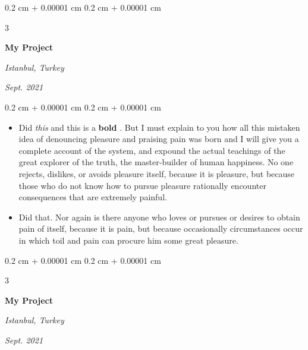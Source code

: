 \documentclass[10pt, letterpaper]{article}
\newenvironment{highlights}{
    \begin{itemize}[
        topsep=0.10 cm,
        parsep=0.10 cm,
        partopsep=0pt,
        itemsep=0pt,
        leftmargin=0.4 cm + 10pt + 0.6 cm
    ]
}{
    \end{itemize}
} %
\newenvironment{onecolentry}{
    \begin{adjustwidth}{
        0.2 cm + 0.00001 cm
    }{
        0.2 cm + 0.00001 cm
    }
}{
    \end{adjustwidth}
} %
\newenvironment{threecolentry}[3][]{
    \onecolentry
    \def\thirdColumn{#3}
    \setcolumnwidth{0.6 cm, \fill, 4.5 cm}
    \begin{paracol}{3}
    #2 \switchcolumn
}{
    \switchcolumn \raggedleft \thirdColumn
    \end{paracol}
    \endonecolentry
} %
\let\hrefWithoutArrow\href
\renewcommand{\href}[2]{\hrefWithoutArrow{#1}{\mbox{\ifthenelse{\equal{#2}{}}{ }{#2 }\raisebox{.15ex}{\footnotesize \faExternalLink*}}}}
\begin{document}
        \vspace{0.2 cm-3px}

        \begin{threecolentry}{
            \vspace*{\fill}
            \textbullet
            \vspace*{3px}
            \vspace*{\fill}
        }{
        \textit{Istanbul, Turkey}    
            
        \textit{Sept. 2021}}
            \textbf{My Project}
        \end{threecolentry}

        \vspace{0.10 cm-3px}
        \begin{onecolentry}
            \begin{highlights}
                \item Did \textit{this} and this is a \textbf{bold} \href{https://example.com}{link}. But I must explain to you how all this mistaken idea of denouncing pleasure and praising pain was born and I will give you a complete account of the system, and expound the actual teachings of the great explorer of the truth, the master-builder of human happiness. No one rejects, dislikes, or avoids pleasure itself, because it is pleasure, but because those who do not know how to pursue pleasure rationally encounter consequences that are extremely painful.
                \item Did that. Nor again is there anyone who loves or pursues or desires to obtain pain of itself, because it is pain, but because occasionally circumstances occur in which toil and pain can procure him some great pleasure.
            \end{highlights}
        \end{onecolentry}


        \vspace{0.2 cm-3px}

        \begin{threecolentry}{
            \vspace*{\fill}
            \textbullet
            \vspace*{3px}
            \vspace*{\fill}
        }{
        \textit{Istanbul, Turkey}    
            
        \textit{Sept. 2021}}
            \textbf{My Project}
        \end{threecolentry}
\end{document}
